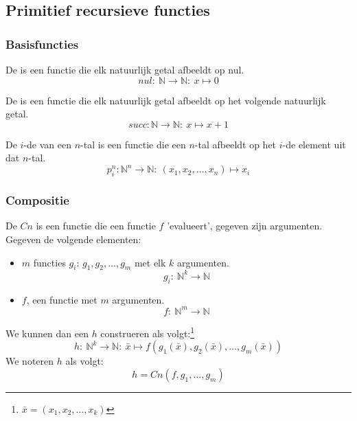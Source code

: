 \documentclass[main.tex]{subfiles}
\begin{document}
\subsection{Primitief recursieve functies}
\label{sec:prim-recurs-funct}

\subsubsection{Basisfuncties}
\label{sec:basisfuncties}

\begin{de}
  De  is een functie die elk natuurlijk getal afbeeldt op nul.
  \[ nul:\ \mathbb{N} \rightarrow \mathbb{N}:\ x \mapsto 0 \]
\end{de}

\begin{de}
  De  is een functie die elk natuurlijk getal afbeeldt op het volgende natuurlijk getal.
  \[ succ: \mathbb{N} \rightarrow \mathbb{N}:\ x \mapsto x+1 \]
\end{de}

\begin{de}
  De $i$-de  van een $n$-tal is een functie die een $n$-tal afbeeldt op het $i$-de element uit dat $n$-tal.
  \[ p_{i}^{n}: \mathbb{N}^{n} \rightarrow \mathbb{N}:\ (x_{1},x_{2}, \dotsc, x_{n}) \mapsto x_{i} \]
\end{de}

\subsubsection{Compositie}
\label{sec:compositie}

\begin{de}
  De  $Cn$ is een functie die een functie $f$ 'evalueert', gegeven zijn argumenten.
  Gegeven de volgende elementen:
  \begin{itemize}
  \item 
    $m$ functies $g_{i}$: $g_{1},g_{2},\dotsc,g_{m}$ met elk $k$ argumenten.
    \[ g_{i}:\ \mathbb{N}^{k} \rightarrow \mathbb{N} \]
  \item 
    $f$, een functie met $m$ argumenten.
    \[ f:\ \mathbb{N}^{m} \rightarrow \mathbb{N} \]
  \end{itemize}
  We kunnen dan een $h$ construeren als volgt:\footnote{$\bar{x} = (x_{1},x_{2},\dotsc,x_{k})$}
  \[ h:\ \mathbb{N}^{k} \rightarrow \mathbb{N}:\ \bar{x} \mapsto f(g_{1}(\bar{x}),g_{2}(\bar{x}),\dotsc,g_{m}(\bar{x})) \]
  We noteren $h$ als volgt:
  \[ h = Cn(f,g_{1},\dotsc,g_{m}) \]
\end{de}
\end{document}

